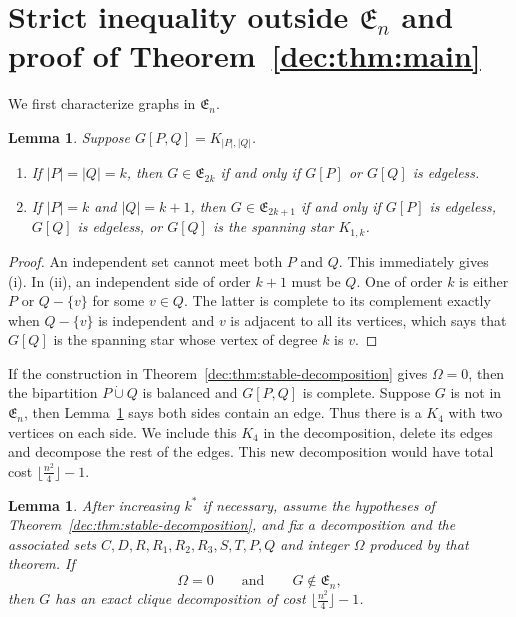 \documentclass[11pt]{article}
\numberwithin{equation}{section}
\newtheorem{lemma}[theorem]{Lemma}
\theoremstyle{remark}
\newcommand{\dotcupunion}{\mathbin{\dot\cup}}
\begin{document}
\section{Strict inequality outside \texorpdfstring{\(\mathfrak E_n\)}{En} and proof of Theorem~\ref{dec:thm:main}}\label{dec:sec:strict-stability}

We first characterize graphs in \(\mathfrak E_n\).

\begin{lemma}
  \label{dec:lem:join-normal-forms}
Suppose \( G[P,Q]=K_{|P|,|Q|}\).
\begin{enumerate}[label=\textup{(\roman*)}]
\item If \(|P|=|Q|=k\), then \(G\in\mathfrak E_{2k}\) if and only if
      \(G[P]\) or \(G[Q]\) is edgeless.
\item If \(|P|=k\) and \(|Q|=k+1\), then
      \(G\in\mathfrak E_{2k+1}\) if and only if \(G[P]\) is edgeless,
      \(G[Q]\) is edgeless, or \(G[Q]\) is the spanning star \(K_{1,k}\).
\end{enumerate}
\end{lemma}

\begin{proof}
An independent set cannot meet both \(P\) and \(Q\).  This immediately
gives (i).  In (ii), an independent side of order \(k+1\) must be \(Q\).
One of order \(k\) is either \(P\) or \(Q-\{v\}\) for some \(v\in Q\).
The latter is complete to its complement exactly when \(Q-\{v\}\) is
independent and \(v\) is adjacent to all its vertices, which says that
\(G[Q]\) is the spanning star whose vertex of degree \(k\) is \(v\).
\end{proof}

If the construction in Theorem~\ref{dec:thm:stable-decomposition} gives \(\Omega =0\),
then the bipartition \(P\dotcupunion Q\) is balanced and \(G[P,Q]\) is complete.
Suppose  \(G\) is not in \(\mathfrak{E}_n\), then Lemma~\ref{dec:lem:join-normal-forms} says
both sides contain an edge. Thus there is a \(K_4\) with two vertices on each side.
We include this \(K_4\) in the decomposition, delete its edges and decompose the rest of the edges.
This new decomposition would have total cost \(\lfloor \frac{n^2}{4}\rfloor-1\).

\begin{lemma}
\label{dec:lem:strict-equality}
After increasing \(k^\ast\) if necessary, assume the hypotheses of Theorem~\ref{dec:thm:stable-decomposition},
and fix a decomposition and the associated sets \(C,D,R,R_1,R_2,R_3,S,T,P,Q\) and integer \(\Omega\) produced by that theorem.  If
\begin{equation*}
 \Omega=0
 \qquad\text{and}\qquad
 G\notin\mathfrak E_{n},
\end{equation*}
then \(G\) has an exact clique decomposition of cost \(\lfloor \frac{n^2}{4}\rfloor-1\).
\end{lemma}
\end{document}
